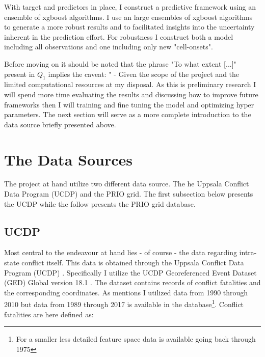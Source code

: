 \documentclass[a4paper]{article}
\begin{document}
With target and predictors in place, I construct a predictive framework using an ensemble of xgboost algorithms. I use an large ensembles of xgboost algorithms to generate a more robust results and to facilitated insights into the uncertainty inherent in the prediction effort. For robustness I construct both a model including all observations and one including only new "cell-onsets".\par

Before moving on it should be noted that the phrase "To what extent [...]" present in $Q_1$ implies the caveat: " - Given the scope of the project and the limited computational resources at my disposal. As this is preliminary research I will spend more time evaluating the results and discussing how to improve future frameworks then I will training and fine tuning the model and optimizing hyper parameters. The next section will serve as a more complete introduction to the data source briefly presented above.\par

\section{The Data Sources} %

The project at hand utilize two different data source. The he Uppsala Conflict Data Program (UCDP) \citep{Sundberg_2013, Croicu_Sundberg_2017} and the PRIO grid\citep{Tollefsen_2012}. The first subsection below presents the UCDP while the follow presents the PRIO grid database.\par

\subsection{UCDP}

Most central to the endeavour at hand lies - of course - the data regarding intra-state conflict itself. This data is obtained through the Uppsala Conflict Data Program (UCDP) \citep{Sundberg_2013, Croicu_Sundberg_2017}. Specifically I utilize the UCDP Georeferenced Event Dataset (GED) Global version 18.1 \citep{UCDP_2017}. The dataset contains records of conflict fatalities and the corresponding coordinates. As mentions I utilized data from 1990 through 2010 but data from 1989 through 2017 is available in the database\footnote{For a smaller less detailed feature space data is available going back through 1975}. Conflict fatalities are here defined as: 
\end{document}
